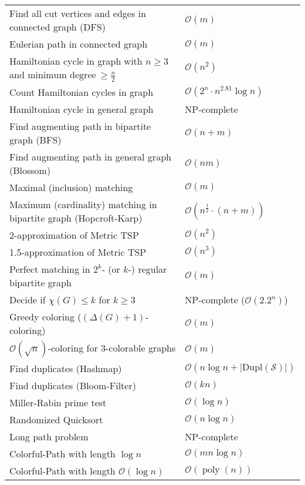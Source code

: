 \documentclass[a4paper,10pt]{article}
\newcommand{\bigO}{\mathcal{O}}
\DeclareMathOperator{\poly}{poly}
\begin{document}
    \begin{center}
    \begin{tabularx}{\textwidth}{Xl}
        \toprule
        Find all cut vertices and edges in connected graph (DFS) & \(\bigO(m)\) \\
        Eulerian path in connected graph & \(\bigO(m)\) \\
        Hamiltonian cycle in graph with $n \geq 3$ and $\text{minimum degree} \ \geq \frac{n}{2}$ & \(\bigO(n^2)\) \\
        Count Hamiltonian cycles in graph & \(\bigO(2^n \cdot n^{2.81} \log n)\) \\
        Hamiltonian cycle in general graph & NP-complete \\
        Find augmenting path in bipartite graph (BFS) & \(\bigO(n + m)\) \\
        Find augmenting path in general graph (Blossom) & \(\bigO(nm)\) \\
        Maximal (inclusion) matching & \(\bigO(m)\) \\
        Maximum (cardinality) matching in bipartite graph (Hopcroft-Karp) & \(\bigO(n^\frac{1}{2} \cdot (n+m))\) \\
        2-approximation of Metric TSP & \(\bigO(n^2)\) \\
        1.5-approximation of Metric TSP & \(\bigO(n^3)\) \\
        Perfect matching in \(2^k\)- (or $k$-) regular bipartite graph & \(\bigO(m)\) \\
        Decide if $\chi(G) \leq k$ for $k \geq 3$ & NP-complete ($\bigO(2.2^n)$) \\
        Greedy coloring ($(\Delta(G) + 1)$-coloring) & \(\bigO(m)\) \\
        \(\bigO(\sqrt{n})\)-coloring for 3-colorable graphs & \(\bigO(m)\) \\
        Find duplicates (Hashmap) & \(\bigO(n \log n + |\text{Dupl}(\mathcal{S})|)\) \\
        Find duplicates (Bloom-Filter) & \(\bigO(kn)\) \\
        Miller-Rabin prime test & \(\bigO(\log n)\) \\
        Randomized Quicksort & \(\bigO(n \log n)\)\footnotemark \\
        Long path problem & NP-complete \\
        Colorful-Path with length \(\log n\) & \(\bigO(mn \log n)\) \\
        Colorful-Path with length \(\bigO(\log n)\) & \(\bigO(\poly(n))\) \\

\end{tabularx}
\end{center}
\end{document}
